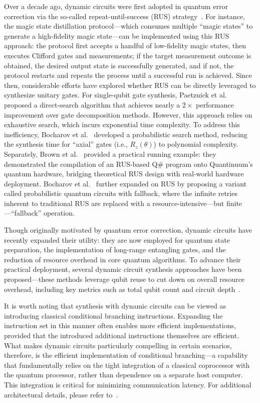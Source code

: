 \documentclass[a4paper,onecolumn,11pt,unpublished]{quantumarticle}
\begin{document}
Over a decade ago, dynamic circuits were first adopted in quantum error correction via the so-called repeat-until-success (RUS) strategy~\cite{Paetznick2014RepeatUntilSuccess}. For instance, the magic state distillation protocol---which consumes multiple ``magic states'' to generate a high-fidelity magic state---can be implemented using this RUS approach: the protocol first accepts a handful of low-fidelity magic states, then executes Clifford gates and measurements; if the target measurement outcome is obtained, the desired output state is successfully generated, and if not, the protocol restarts and repeats the process until a successful run is achieved. Since then, considerable efforts have explored whether RUS can be directly leveraged to synthesize unitary gates. For single-qubit gate synthesis, Paetznick et al.~\cite{Paetznick2014RepeatUntilSuccess} proposed a direct-search algorithm that achieves nearly a $2\times$ performance improvement over gate decomposition methods. However, this approach relies on exhaustive search, which incurs exponential time complexity. To address this inefficiency, Bocharov et al.~\cite{Bocharov2015Efficient} developed a probabilistic search method, reducing the synthesis time for ``axial'' gates (i.e., $R_z(\theta)$) to polynomial complexity. Separately, Brown et al.~\cite{Brown2023Advances} provided a practical running example: they demonstrated the compilation of an RUS-based Q\# program onto Quantinuum's quantum hardware, bridging theoretical RUS design with real-world hardware deployment. Bocharov et al.~\cite{Bocharov2015Efficient} further expanded on RUS by proposing a variant called probabilistic quantum circuits with fallback, where the infinite retries inherent to traditional RUS are replaced with a resource-intensive---but finite---``fallback'' operation.

Though originally motivated by quantum error correction, dynamic circuits have recently expanded their utility: they are now employed for quantum state preparation, the implementation of long-range entangling gates, and the reduction of resource overhead in core quantum algorithms. To advance their practical deployment, several dynamic circuit synthesis approaches have been proposed---these methods leverage qubit reuse to cut down on overall resource overhead, including key metrics such as total qubit count and circuit depth~\cite{niu2024ac,fang2023dynamic}.

It is worth noting that synthesis with dynamic circuits can be viewed as introducing classical conditional branching instructions. Expanding the instruction set in this manner often enables more efficient implementations, provided that the introduced additional instructions themselves are efficient. What makes dynamic circuits particularly compelling in certain scenarios, therefore, is the efficient implementation of conditional branching---a capability that fundamentally relies on the tight integration of a classical coprocessor with the quantum processor, rather than dependence on a separate host computer. This integration is critical for minimizing communication latency. For additional architectural details, please refer to~.
\end{document}
